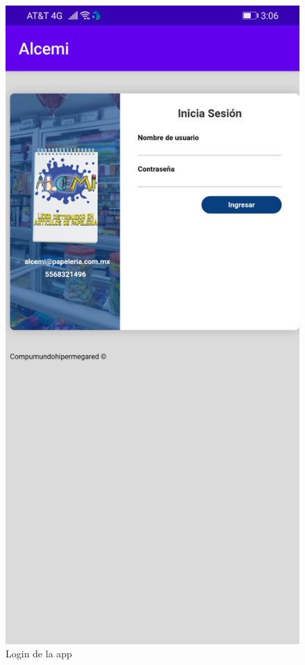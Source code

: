 \documentclass{article}
\begin{document}
\begin{figure}[h]
\begin{minipage}[t]{0.5\linewidth}
\caption {Login de la app}
\centering
\includegraphics[scale=0.16]{fig11}
\end{minipage}
\end{figure}
\end{document}
